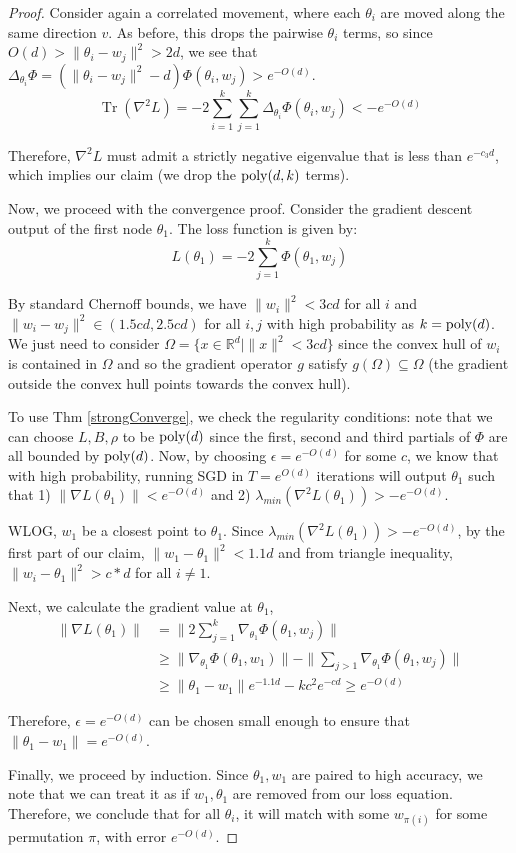 \documentclass{article}
\newcommand{\R}{{\mathbb{R}}}
\DeclareMathOperator{\Tr}{Tr}
\begin{document}
\begin{proof}
Consider again a correlated movement, where each $\theta_i$ are moved along the same direction $v$. As before, this drops the pairwise $\theta_i$ terms, so since $O(d) > \|\theta_i -w_j\|^2 > 2d$, we see that $\Delta_{\theta_i} \Phi = (\|\theta_i -w_j\|^2 - d)\Phi(\theta_i,w_j) > e^{-O(d)}$. 
%
\[\Tr(\nabla^2 L) = -2\sum_{i=1}^k \sum_{j=1}^k \Delta_{\theta_i}\Phi(\theta_i, w_j) < -e^{-O(d)}\]

Therefore, $\nabla^2 L$ must admit a strictly negative eigenvalue that
is less than $e^{-c_3 d}$, which implies our claim (we drop the
$\mathrm{poly}(d,k)$ terms).

Now, we proceed with the convergence proof. Consider the gradient descent output of the first node $\theta_1$. The loss function is given by:
%
\[L(\theta_1) =  - 2\sum_{j=1}^k \Phi(\theta_1,w_j)\]

By standard Chernoff bounds, we have $\|w_i\|^2 < 3cd$ for all $i$ and $\|w_i -w_j\|^2 \in (1.5cd, 2.5cd)$ for all $i, j$ with high probability as $k = \mathrm{poly}(d)$. We just need to consider $\Omega = \{ x \in \R^d | \|x \|^2 < 3cd\}$ since the convex hull of $w_i$ is contained in $\Omega$ and so the gradient operator $g$ satisfy $g(\Omega) \subseteq \Omega$ (the gradient outside the convex hull points towards the convex hull).  

To use Thm \ref{strongConverge}, we check the regularity conditions: note that we can choose $L, B, \rho$ to be $\mathrm{poly}(d)$ since the first, second and third partials of $\Phi$ are all bounded by $\mathrm{poly}(d)$. Now, by choosing $\epsilon = e^{-O(d)}$ for some $c$, we know that with high probability, running SGD in $T = e^{O(d)}$ iterations will output $\theta_1$ such that 1) $\|\nabla L (\theta_1)\| < e^{-O(d)}$ and 2) $\lambda_{min}(\nabla^2L(\theta_1)) > -e^{-O(d)}$.

WLOG, $w_1$ be a closest point to $\theta_1$. Since  $\lambda_{min}(\nabla^2L(\theta_1)) > -e^{-O(d)}$, by the first part of our claim, $\|w_1 - \theta_1\|^2 < 1.1d$ and from triangle inequality, $\|w_i - \theta_1 \|^2 > c*d$ for all $i \neq 1$. 

Next, we calculate the gradient value at $\theta_1$, 
\begin{align*}
\|\nabla L(\theta_1)\| & = \|2\sum_{j=1}^k
                         \nabla_{\theta_1}\Phi(\theta_1,w_j)\| \\
& \geq \|\nabla_{\theta_1} \Phi(\theta_1,w_1) \| - \|\sum_{j>1}
  \nabla_{\theta_1}\Phi(\theta_1,w_j)\| \\
& \geq \|\theta_1-w_1\|e^{-1.1d} - kc^2e^{-cd} \geq e^{-O(d)} 
\end{align*}

Therefore, $\epsilon = e^{-O(d)}$ can be chosen small enough to ensure that $\|\theta_1 - w_1\| = e^{-O(d)}$. 

Finally, we proceed by induction. Since $\theta_1, w_1$ are paired to high accuracy, we note that we can treat it as if $w_1, \theta_1$ are removed from our loss equation. Therefore, we conclude that for all $\theta_i$, it will match with some $w_{\pi(i)}$ for some permutation $\pi$, with error $e^{-O(d)}$. 
\end{proof}
\fi
\end{document}
